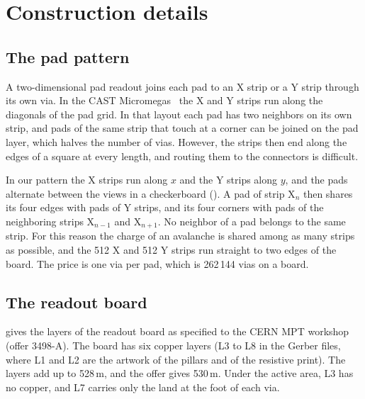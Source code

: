 \section{Construction details}\label{app:construction}

\subsection{The pad pattern}\label{app:pattern}
A two-dimensional pad readout joins each pad to an X strip or a Y strip through its own via. In the CAST
Micromegas~\cite{Abbon2007CAST} the X and Y strips run along the diagonals of the pad grid. In that layout each pad has
two neighbors on its own strip, and pads of the same strip that touch at a corner can be joined on the pad layer, which
halves the number of vias. However, the strips then end along the edges of a square at every length, and routing them
to the connectors is difficult.

In our pattern the X strips run along $x$ and the Y strips along $y$, and the pads alternate between the views in a
checkerboard (). A pad of strip X$_n$ then shares its four edges with pads of Y strips, and its
four corners with pads of the neighboring strips X$_{n-1}$ and X$_{n+1}$. No neighbor of a pad belongs to the same
strip. For this reason the charge of an avalanche is shared among as many strips as possible, and the 512 X and 512 Y
strips run straight to two edges of the board. The price is one via per pad, which is 262\,144 vias on a board.

\subsection{The readout board}\label{app:boardstack}
 gives the layers of the readout board as specified to the CERN MPT workshop (offer 3498-A). The
board has six copper layers (L3 to L8 in the Gerber files, where L1 and L2 are the artwork of the pillars and of the
resistive print). The layers add up to 528\,\textmu m, and the offer gives 530\,\textmu m. Under the active area,
L3 has no copper, and L7 carries only the land at the foot of each via.

